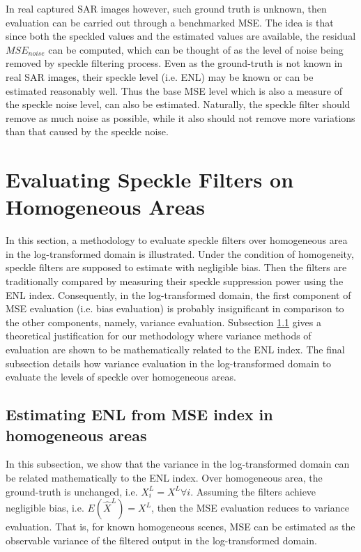 \documentclass[journal]{IEEEtran}
\begin{document}
In real captured SAR images however, such ground truth is unknown, then evaluation can be carried out through a benchmarked MSE. 
The idea is that since both the speckled values and the estimated values are available, the residual $MSE_{noise}$ can be computed, which can be thought of as the level of noise being removed by speckle filtering process.
Even as the ground-truth is not known in real SAR images, their speckle level (i.e. ENL) may be known or can be estimated reasonably well.
Thus the base MSE level which is also a measure of the speckle noise level, can also be estimated.
Naturally, the speckle filter should remove as much noise as possible, 
	while it also should not remove more variations than that caused by the speckle noise.

\section{Evaluating Speckle Filters on Homogeneous Areas}
\label{sec:eval_homo}

In this section, a methodology to evaluate speckle filters over homogeneous area in the log-transformed domain is illustrated.
Under the condition of homogeneity, speckle filters are supposed to estimate with negligible bias.
Then the filters are traditionally compared by measuring their speckle suppression power using the ENL index.
Consequently, in the log-transformed domain, the first component of MSE evaluation (i.e. bias evaluation) is probably insignificant in comparison to the other components, namely, variance evaluation. 
Subsection \ref{sec:homogeneous_theoretical} gives a theoretical justification for our methodology where variance methods of evaluation are shown to be mathematically related to the ENL index.
The final subsection details how variance evaluation in the log-transformed domain to evaluate the levels of speckle over homogeneous areas.

\subsection{ Estimating ENL from MSE index in homogeneous areas }
\label{sec:homogeneous_theoretical}

In this subsection, we show that the variance in the log-transformed domain can be related mathematically to the ENL index. 
Over homogeneous area, the ground-truth is unchanged, i.e. $X^L_i=X^L \forall i$.
Assuming the filters achieve negligible bias, i.e. $E(\hat{X}^L)=X^L$, 
	then the MSE evaluation reduces to variance evaluation.
That is, for known homogeneous scenes, MSE can be estimated as the observable variance of the filtered output in the log-transformed domain.
\end{document}
